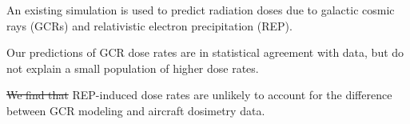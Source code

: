 \documentclass[draft]{agujournal2019}
\providecommand{\DIFdel}[1]{{\protect\color{red}\sout{#1}}}                      %
\providecommand{\DIFdelbegin}{} %
\providecommand{\DIFdelend}{} %
\newcommand{\DIFscaledelfig}{0.5}
\newlength{\DIFdelgraphicswidth} %
\newlength{\DIFdelgraphicsheight} %
\newcommand{\DIFdelincludegraphics}[2][]{%
\sbox{\DIFdelgraphicsbox}{\DIFOincludegraphics[#1]{#2}}%
\settoboxwidth{\DIFdelgraphicswidth}{\DIFdelgraphicsbox} %
\settoboxtotalheight{\DIFdelgraphicsheight}{\DIFdelgraphicsbox} %
\scalebox{\DIFscaledelfig}{%
\parbox[b]{\DIFdelgraphicswidth}{\usebox{\DIFdelgraphicsbox}\\[-\baselineskip] \rule{\DIFdelgraphicswidth}{0em}}\llap{\resizebox{\DIFdelgraphicswidth}{\DIFdelgraphicsheight}{%
\setlength{\unitlength}{\DIFdelgraphicswidth}%
\begin{picture}(1,1)%
\thicklines\linethickness{2pt} %
{\color[rgb]{1,0,0}\put(0,0){\framebox(1,1){}}}%
{\color[rgb]{1,0,0}\put(0,0){\line( 1,1){1}}}%
{\color[rgb]{1,0,0}\put(0,1){\line(1,-1){1}}}%
\end{picture}%
}\hspace*{3pt}}} %
} %
\DeclareRobustCommand{\DIFdelbegin}{\DIFOdelbegin \let\includegraphics\DIFdelincludegraphics} %
\DeclareRobustCommand{\DIFdelend}{\DIFOaddend \let\includegraphics\DIFOincludegraphics} %
\begin{document}

\begin{keypoints}
  \item An existing simulation is used to predict radiation doses due to galactic cosmic rays (GCRs) and relativistic electron precipitation (REP).
  \item Our predictions of GCR dose rates are in statistical agreement with data, but do not explain a small population of higher dose rates.
  \item \DIFdelbegin \DIFdel{We find that }\DIFdelend REP-induced dose rates are unlikely to account for the difference between GCR modeling and aircraft dosimetry data.
\end{keypoints}

%
%

%
%

\end{document}
